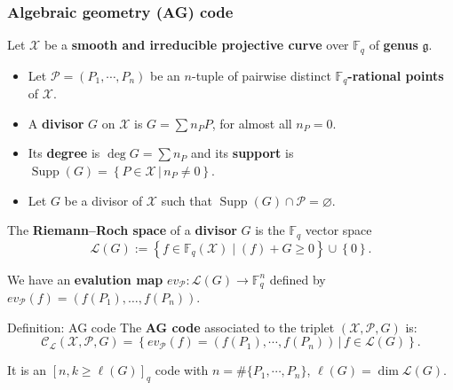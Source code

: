 \documentclass[
10pt, %
%
aspectratio=169, %
]{beamer}
\theoremstyle{plain}%
\theoremstyle{definition}
\theoremstyle{remark}
\newcommand{\calP}{\mathcal{P}}
\newcommand{\calL}{\mathcal{L}}
\newcommand{\calC}{\mathcal{C}}
\newcommand{\calX}{\mathcal{X}}
\newcommand{\fqm}{\mathbb{F}_{q^m}}
\newcommand{\fq}{\mathbb{F}_{q}}
\newcommand{\set}[1]{\left\{#1\right\}}
\newcommand{\Supp}{\operatorname{Supp}}
\begin{document}
\begin{frame}
	\frametitle{Algebraic geometry (AG) code}
	Let $\calX$ be a \textbf{smooth and irreducible projective curve} over $\fq$ of \textbf{genus} $\mathfrak{g}$.
	
	\begin{itemize}
		\item Let $\calP =  \left( P_1,\cdots,P_n \right) $ be an $n$-tuple of pairwise distinct $\fq$\textbf{-rational points} of $\calX$.
		\item A \textbf{divisor} $G$ on $\calX$ is $G=\sum n_P P$, for almost all $n_P=0$.
		\item Its \textbf{degree} is $\deg G = \sum n_P$ and its \textbf{support} is $\Supp(G)=\left\lbrace P \in \calX \, |\, n_P\neq 0\right\rbrace $.
		\item Let $G$ be a divisor of $\calX$ such that $\Supp(G) \cap \calP= \varnothing$.
	\end{itemize}
 
The \textbf{Riemann--Roch space} of a \textbf{divisor} $G$ is the $\fq$ vector space
$$ \calL(G) := \set{f \in \fq(\calX) \mid (f) + G \geq 0} \cup \set{0}.$$
\begin{tcolorbox}[colback=lightkhaki]
	We have an \textbf{evalution map} $ev_{\calP} \colon \calL(G)	\rightarrow   \fq^n $ defined by $ev_{\calP}(f)=\left( f(P_1),\dots,f(P_n) \right)$.
\end{tcolorbox}
\begin{block}{Definition: AG code}
	The \textbf{AG code} associated to the triplet $(\calX, \calP, G)$ is:
	\vspace{-0.8em}
	\[ \calC_{\calL}(\calX,\calP,G)= \left\lbrace ev_{\calP}(f)=(f(P_1),\cdots,f(P_n))\,|\, f \in \calL(G)\right\rbrace. \] 
\end{block}
\vspace{-0.8em}
It is an $[n, k \geq \ell(G)]_{q}$ code with $n=\#\{P_1,\cdots,P_n\}$, $\ell(G) = \dim\calL(G)$.
\end{frame}
\end{document}
